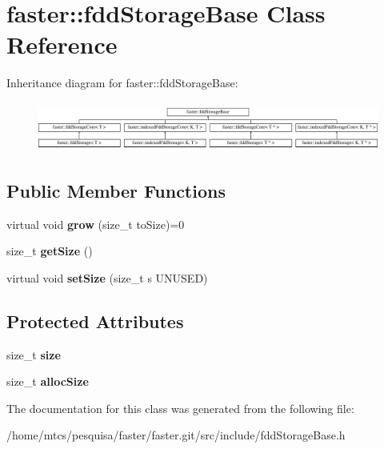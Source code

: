 \hypertarget{classfaster_1_1fddStorageBase}{}\section{faster\+:\+:fdd\+Storage\+Base Class Reference}
\label{classfaster_1_1fddStorageBase}
Inheritance diagram for faster\+:\+:fdd\+Storage\+Base\+:\begin{figure}[H]
\begin{center}
\leavevmode
\includegraphics[height=1.640625cm]{classfaster_1_1fddStorageBase}
\end{center}
\end{figure}
\subsection*{Public Member Functions}
\begin{DoxyCompactItemize}
\item 
\hypertarget{classfaster_1_1fddStorageBase_a8052833a8e5c933d14370c0c3ed6bdeb}{}virtual void {\bfseries grow} (size\+\_\+t to\+Size)=0\label{classfaster_1_1fddStorageBase_a8052833a8e5c933d14370c0c3ed6bdeb}

\item 
\hypertarget{classfaster_1_1fddStorageBase_adfcf6d4431323da59cebc65702dbb079}{}size\+\_\+t {\bfseries get\+Size} ()\label{classfaster_1_1fddStorageBase_adfcf6d4431323da59cebc65702dbb079}

\item 
\hypertarget{classfaster_1_1fddStorageBase_aa71da7a3babbd344210d1fcbb7b5e3dc}{}virtual void {\bfseries set\+Size} (size\+\_\+t s U\+N\+U\+S\+E\+D)\label{classfaster_1_1fddStorageBase_aa71da7a3babbd344210d1fcbb7b5e3dc}

\end{DoxyCompactItemize}
\subsection*{Protected Attributes}
\begin{DoxyCompactItemize}
\item 
\hypertarget{classfaster_1_1fddStorageBase_a02c7538275a50f7dd83330acc631a603}{}size\+\_\+t {\bfseries size}\label{classfaster_1_1fddStorageBase_a02c7538275a50f7dd83330acc631a603}

\item 
\hypertarget{classfaster_1_1fddStorageBase_a474fed6198e4bc7c41cdb2d464bb77ec}{}size\+\_\+t {\bfseries alloc\+Size}\label{classfaster_1_1fddStorageBase_a474fed6198e4bc7c41cdb2d464bb77ec}

\end{DoxyCompactItemize}


The documentation for this class was generated from the following file\+:\begin{DoxyCompactItemize}
\item 
/home/mtcs/pesquisa/faster/faster.\+git/src/include/fdd\+Storage\+Base.\+h\end{DoxyCompactItemize}
